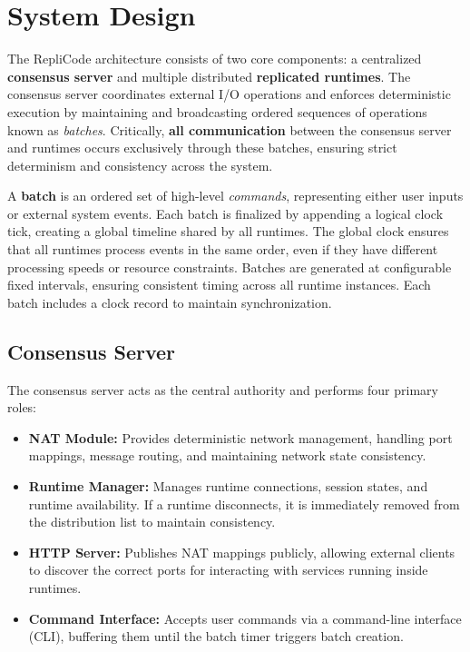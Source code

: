 \documentclass[10pt, 
]{IEEEtran}
\begin{document}
\section{System Design}

The RepliCode architecture consists of two core components: a centralized \textbf{consensus server} and multiple distributed \textbf{replicated runtimes}. The consensus server coordinates external I/O operations and enforces deterministic execution by maintaining and broadcasting ordered sequences of operations known as \emph{batches}. Critically, \textbf{all communication} between the consensus server and runtimes occurs exclusively through these batches, ensuring strict determinism and consistency across the system.

A \textbf{batch} is an ordered set of high-level \emph{commands}, representing either user inputs or external system events. Each batch is finalized by appending a logical clock tick, creating a global timeline shared by all runtimes. The global clock ensures that all runtimes process events in the same order, even if they have different processing speeds or resource constraints. Batches are generated at configurable fixed intervals, ensuring consistent timing across all runtime instances. Each batch includes a clock record to maintain synchronization.

\subsection{Consensus Server}

The consensus server acts as the central authority and performs four primary roles:

\begin{itemize}
\item \textbf{NAT Module:} Provides deterministic network management, handling port mappings, message routing, and maintaining network state consistency.
\item \textbf{Runtime Manager:} Manages runtime connections, session states, and runtime availability. If a runtime disconnects, it is immediately removed from the distribution list to maintain consistency.
\item \textbf{HTTP Server:} Publishes NAT mappings publicly, allowing external clients to discover the correct ports for interacting with services running inside runtimes.
\item \textbf{Command Interface:} Accepts user commands via a command-line interface (CLI), buffering them until the batch timer triggers batch creation.
\end{itemize}
\end{document}

